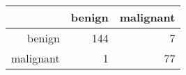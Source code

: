 \begin{tabular}{rrr}
  \hline
 & benign & malignant \\ 
  \hline
benign & 144 &   7 \\ 
  malignant &   1 &  77 \\ 
   \hline
\end{tabular}
